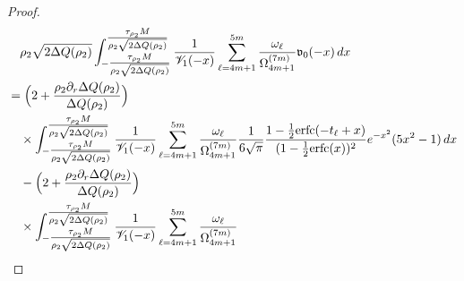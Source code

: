 \documentclass[a4paper]{article}
\newcommand{\erfc}{{\rm erfc}}
\numberwithin{equation}{section}
\begin{document}
\begin{proof}

\begin{align*}
 &\quad
 \rho_2\sqrt{2\Delta Q(\rho_2)}
\int_{-\tfrac{\tau_{\rho_2}M}{\rho_2\sqrt{2\Delta Q(\rho_2)}}}^{\tfrac{\tau_{\rho_2}M}{\rho_2\sqrt{2\Delta Q(\rho_2)}}}
\frac{1}{\mathscr{V}_1(-x)}
\sum_{\ell=4m+1}^{5m}\frac{\omega_{\ell}}{\Omega_{4m+1}^{(7m)}}
\mathfrak{v}_0(-x)
\,dx   
\\
&=
\Bigl(2+\frac{\rho_2\partial_r\Delta Q(\rho_2)}{\Delta Q(\rho_2)}\Bigr)
\\
&\quad\times\int_{-\tfrac{\tau_{\rho_2}M}{\rho_2\sqrt{2\Delta Q(\rho_2)}}}^{\tfrac{\tau_{\rho_2}M}{\rho_2\sqrt{2\Delta Q(\rho_2)}}}
\frac{1}{\mathscr{V}_1(-x)}
\sum_{\ell=4m+1}^{5m}\frac{\omega_{\ell}}{\Omega_{4m+1}^{(7m)}}
\frac{1}{6\sqrt{\pi}}
\frac{1-\frac{1}{2}\erfc(-t_{\ell}+x)}{(1-\frac{1}{2}\erfc(x))^2}e^{-x^2}
(5x^2-1)
\,dx
\\
&\quad
-
\Bigl(2+\frac{\rho_2\partial_r\Delta Q(\rho_2)}{\Delta Q(\rho_2)}\Bigr)
\\
&\quad\times\int_{-\tfrac{\tau_{\rho_2}M}{\rho_2\sqrt{2\Delta Q(\rho_2)}}}^{\tfrac{\tau_{\rho_2}M}{\rho_2\sqrt{2\Delta Q(\rho_2)}}}
\frac{1}{\mathscr{V}_1( -x)}
\sum_{\ell=4m+1}^{5m}\frac{\omega_{\ell}}{\Omega_{4m+1}^{(7m)}}

\end{align*}
\end{proof}
\end{document}
